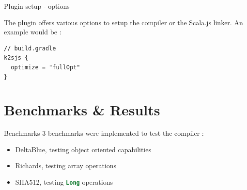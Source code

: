 \documentclass[10pt]{beamer}
\newcommand{\inlinecode}[2]{\colorbox{minted-bg}{\lstinline[language=#1]$#2$}}
\newcommand{\ktinline}[1]{\inlinecode{kotlin}{#1}}
\begin{document}
\begin{frame}[fragile]{Plugin setup - options}

The plugin offers various options to setup the compiler or the Scala.js linker. An example would be :

 \begin{verbatim}
// build.gradle
k2sjs {
  optimize = "fullOpt"
}
 \end{verbatim}

\end{frame}



\section{Benchmarks \& Results}


\begin{frame}{Benchmarks}
  3 benchmarks were implemented to test the compiler :

 \begin{itemize}
  \item DeltaBlue, testing object oriented capabilities
  \item Richards, testing array operations
  \item SHA512, testing \ktinline{Long} operations
 \end{itemize}

\end{frame}
\end{document}
